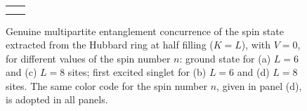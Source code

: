 \begin{figure}
  \centering
  \setlength{\columnwidth}{0.42\textwidth}%
  \begin{tabular}{@{}c@{\hspace{6mm}}c@{}}
     &  \\[2pt]
     & 
  \end{tabular}
  \caption{Genuine multipartite entanglement concurrence of the spin state extracted from the Hubbard ring at
    half filling ($K=L$), with $V=0$, for different values of the spin number $n$: ground state for (a) $L=6$ and
    (c) $L=8$ sites; first excited singlet for (b) $L=6$ and (d) $L=8$ sites. The same color code for the spin
    number $n$, given in panel (d), is adopted in all panels.}
  \label{fig01}
\end{figure}

